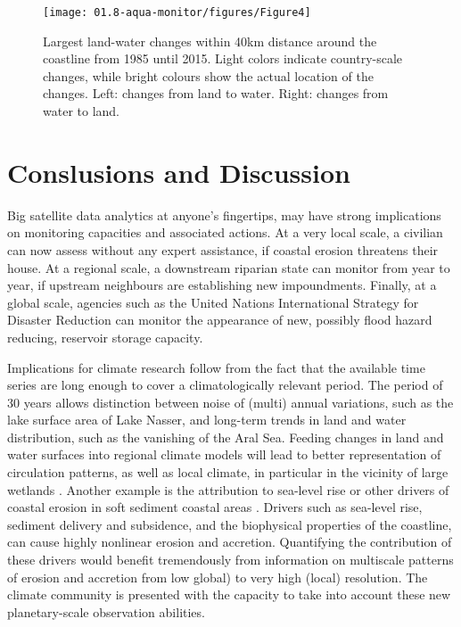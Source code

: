 \begin{figure}
	\centering
	\texttt{[image: 01.8-aqua-monitor/figures/Figure4]}
	\caption{Largest land-water changes within 40km distance around the coastline from 1985 until 2015. Light colors indicate country-scale changes, while bright colours show the actual location of the changes. Left: changes from land to water. Right: changes from water to land.}
	\label{fig:am-coasline}
\end{figure}

\section{Conslusions and Discussion}
Big satellite data analytics at anyone’s fingertips, may have strong implications on monitoring capacities and associated actions. At a very local scale, a civilian can now assess without any expert assistance, if coastal erosion threatens their house. At a regional scale, a downstream riparian state can monitor from year to year, if upstream neighbours are establishing new impoundments. Finally, at a global scale, agencies such as the United Nations International Strategy for Disaster Reduction can monitor the appearance of new, possibly flood hazard reducing, reservoir storage capacity.

Implications for climate research follow from the fact that the available time series are long enough to cover a climatologically relevant period. The period of 30 years allows distinction between noise of (multi)
annual variations, such as the lake surface area of Lake Nasser, and long-term trends in land and water distribution, such as the vanishing of the Aral Sea. Feeding changes in land and water surfaces into regional climate models will lead to better representation of circulation patterns, as well as local climate, in particular in the vicinity of large wetlands \citet{Mohamed2005}. Another example is the attribution to sea-level rise or other drivers of coastal erosion in soft sediment coastal areas \citet{Barros2015}. Drivers such as sea-level rise, sediment delivery and subsidence, and the biophysical properties of the coastline, can cause highly nonlinear erosion and accretion. Quantifying the contribution of these drivers would benefit tremendously from information on multiscale patterns of erosion and accretion from low global) to very high (local) resolution. The climate community is presented with the capacity to take into account these new planetary-scale observation abilities.
